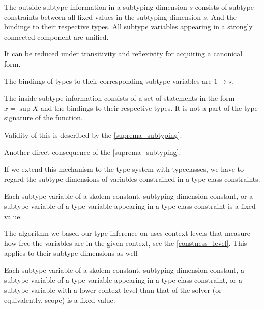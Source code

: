 \begin{defn}
    The outside subtype information in a subtyping dimension $s$ consists of subtype constraints between all fixed values in the subtyping dimension $s$. And the bindings to their respective types. All subtype variables appearing in a strongly connected component are unified.

    It can be reduced under transitivity and reflexivity for acquiring a canonical form.
\end{defn}

\begin{remark}
    The bindings of types to their corresponding subtype variables are $1 \to \star$.
\end{remark}

\begin{defn}
    The inside subtype information consists of a set of statements in the form $x = \sup X$ and the bindings to their respective types. It is not a part of the type signature of the function.

    Validity of this is described by the \cref{suprema_subtyping}.
\end{defn}

\begin{remark}
    Another direct consequence of the \cref{suprema_subtyping}.
\end{remark}

If we extend this mechanism to the type system with typeclasses, we have to regard the subtype dimensions of variables constrained in a type class constraints.

\begin{defn}
    Each subtype variable of a skolem constant, subtyping dimension constant, or a subtype variable of a type variable appearing in a type class constraint is a fixed value.
\end{defn}


The algorithm we based our type inference on uses context levels that measure how free the variables are in the given context, see the \cref{constness_level}. This applies to their subtype dimensions as well

\begin{defn}
    Each subtype variable of a skolem constant, subtyping dimension constant, a subtype variable of a type variable appearing in a type class constraint, or a subtype variable with a lower context level than that of the solver (or equivalently, scope) is a fixed value.
\end{defn}


